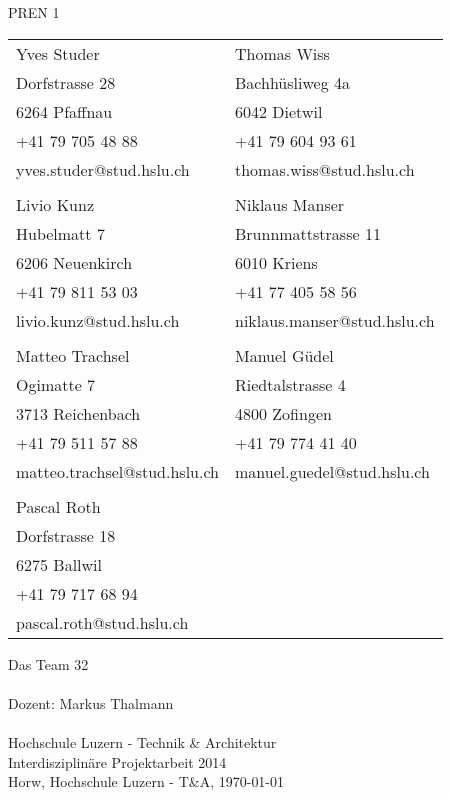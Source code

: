 \begin{titlepage}
    \parindent0pt {\Huge PREN 1}\\
    \vspace*{0.7cm}
    \newline
    \begin{tabular}{ p{6cm} p{5cm}}
        Yves Studer                & Thomas Wiss \\
        Dorfstrasse 28             & Bachhüsliweg 4a \\
        6264 Pfaffnau              & 6042 Dietwil \\
        +41 79 705 48 88           & +41 79 604 93 61 \\
        yves.studer@stud.hslu.ch   & thomas.wiss@stud.hslu.ch \\
                                   & \\
        Livio Kunz                 & Niklaus Manser \\
        Hubelmatt 7                & Brunnmattstrasse 11\\
        6206 Neuenkirch            & 6010 Kriens \\
        +41 79 811 53 03           & +41 77 405 58 56 \\
        livio.kunz@stud.hslu.ch    & niklaus.manser@stud.hslu.ch \\
                                   & \\
        Matteo Trachsel			   & Manuel Güdel \\
        Ogimatte 7                 & Riedtalstrasse 4\\
        3713 Reichenbach           & 4800 Zofingen\\
        +41 79 511 57 88           & +41 79 774 41 40 \\
        matteo.trachsel@stud.hslu.ch & manuel.guedel@stud.hslu.ch \\
        						   & \\
        Pascal Roth			       & \\
        Dorfstrasse 18			   & \\
        6275 Ballwil		       & \\
        +41 79 717 68 94	       & \\
        pascal.roth@stud.hslu.ch   & \\
    \end{tabular}
    \vspace*{1.7cm}
    \newline
    {\Huge Das Team 32}\\
    \vspace*{1.2cm}\\
    {\normalsize Dozent: Markus Thalmann}\\
    \vspace*{0.2cm}\\
    {\normalsize Hochschule Luzern - Technik \& Architektur}\\
    {\normalsize Interdisziplinäre Projektarbeit 2014}\\
    \vspace*{2.3cm}
    \newline
    {\normalsize Horw, Hochschule Luzern - T\&A, \today}\\
\end{titlepage}
